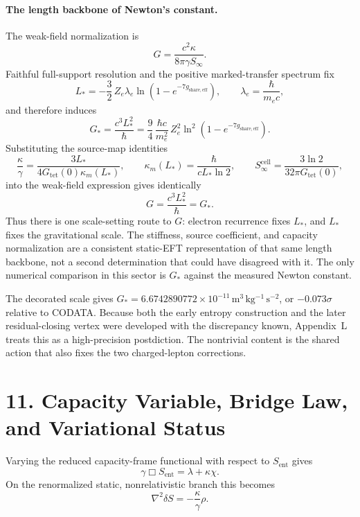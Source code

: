 \documentclass[11pt]{article}
\begin{document}
\paragraph{The length backbone of Newton's constant.}
The weak-field normalization is
\[
G=\frac{c^2\kappa}{8\pi\gamma S_\infty}.
\]
Faithful full-support resolution and the positive marked-transfer spectrum fix
\[
L_*=-\frac32\,Z_e\lambda_e\ln\!\left(1-e^{-7g_{\mathrm{share,eff}}}\right),
\qquad
\lambda_e=\frac{\hbar}{m_ec},
\]
and therefore induces
\[
G_*=\frac{c^3L_*^2}{\hbar}
=
\frac94\,\frac{\hbar c}{m_e^2}\,
Z_e^2\ln^2\!\left(1-e^{-7g_{\mathrm{share,eff}}}\right).
\]
Substituting the source-map identities
\[
\frac{\kappa}{\gamma}=\frac{3L_*}{4G_{\mathrm{tet}}(0)\kappa_m(L_*)},
\qquad
\kappa_m(L_*)=\frac{\hbar}{cL_*\ln2},
\qquad
S_\infty^{\mathrm{cell}}=\frac{3\ln2}{32\pi G_{\mathrm{tet}}(0)},
\]
into the weak-field expression gives identically
\[
G=\frac{c^3L_*^2}{\hbar}=G_*.
\]
Thus there is one scale-setting route to $G$: electron recurrence fixes $L_*$, and $L_*$ fixes the gravitational scale. The stiffness, source coefficient, and capacity normalization are a consistent static-EFT representation of that same length backbone, not a second determination that could have disagreed with it. The only numerical comparison in this sector is $G_*$ against the measured Newton constant.

The decorated scale gives $G_*=6.6742890772\times10^{-11}\,\mathrm{m^3\,kg^{-1}\,s^{-2}}$, or $-0.073\sigma$ relative to CODATA. Because both the early entropy construction and the later residual-closing vertex were developed with the discrepancy known, Appendix~L treats this as a high-precision postdiction. The nontrivial content is the shared action that also fixes the two charged-lepton corrections.

\section{11. Capacity Variable, Bridge Law, and Variational Status}

Varying the reduced capacity-frame functional with respect to $S_{\mathrm{ent}}$ gives
\[
\gamma\Box S_{\mathrm{ent}}=\lambda+\kappa\chi.
\]
On the renormalized static, nonrelativistic branch this becomes
\[
\nabla^2\delta S=-\frac{\kappa}{\gamma}\rho.
\]
\end{document}
